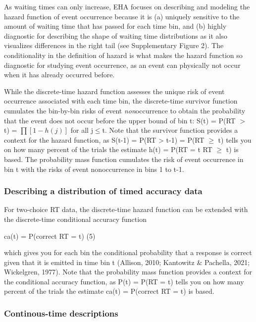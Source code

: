 \documentclass[
  english,
  man,floatsintext]{apa6}
\begin{document}
As waiting times can only increase, EHA focuses on describing and modeling the hazard function of event occurrence because it is (a) uniquely sensitive to the amount of waiting time that has passed for each time bin, and (b) highly diagnostic for describing the shape of waiting time distributions as it also visualizes differences in the right tail (see Supplementary Figure 2). The conditionality in the definition of hazard is what makes the hazard function so diagnostic for studying event occurrence, as an event can physically not occur when it has already occurred before.

While the discrete-time hazard function assesses the unique risk of event occurrence associated with each time bin, the discrete-time survivor function cumulates the bin-by-bin risks of event \emph{non}occurrence to obtain the probability that the event does not occur before the upper bound of bin t: S(t) = P(RT \(>\) t) = \(\prod [1-h(j)]\) for all j\(\leq\)t. Note that the survivor function provides a context for the hazard function, as S(t-1) = P(RT \textgreater{} t-1) = P(RT \(\geq\) t) tells you on how many percent of the trials the estimate h(t) = P(RT = t\textbar{} RT \(\geq\) t) is based. The probability mass function cumulates the risk of event occurrence in bin t with the risks of event nonoccurrence in bins 1 to t-1.

\subsubsection{Describing a distribution of timed accuracy data}\label{describing-a-distribution-of-timed-accuracy-data}

For two-choice RT data, the discrete-time hazard function can be extended with the discrete-time conditional accuracy function

\noindent ca(t) = P(correct \textbar{} RT = t) \hfill  (5)

\noindent which gives you for each bin the conditional probability that a response is correct given that it is emitted in time bin t (Allison, 2010; Kantowitz \& Pachella, 2021; Wickelgren, 1977).
Note that the probability mass function provides a context for the conditional accuracy function, as P(t) = P(RT = t) tells you on how many percent of the trials the estimate ca(t) = P(correct \textbar{} RT = t) is based.

\subsubsection{Continous-time descriptions}\label{continous-time-descriptions}
\end{document}
